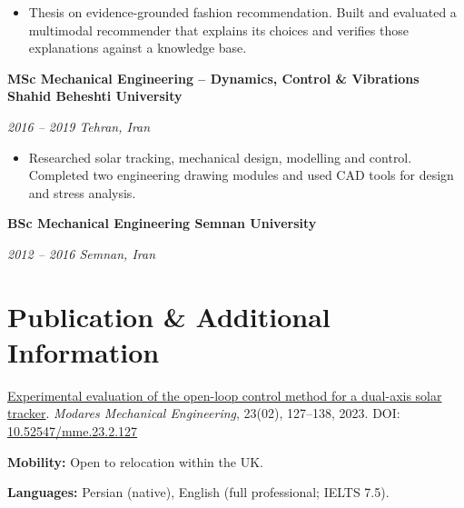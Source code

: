 \documentclass[10pt,a4paper]{article}
\let\cvOriginalTextbf\textbf
\renewcommand{\textbf}[1]{{\fontsize{10.5pt}{14pt}\selectfont\cvOriginalTextbf{#1}}}
\providecommand{\tightlist}{\setlength{\itemsep}{3pt}\setlength{\parskip}{0pt}}
\begin{document}
\begin{itemize}
\tightlist
\item
  Thesis on evidence-grounded fashion recommendation. Built and
  evaluated a multimodal recommender that explains its choices and
  verifies those explanations against a knowledge base.
\end{itemize}

\textbf{MSc Mechanical Engineering -- Dynamics, Control \& Vibrations
\textbar{} Shahid Beheshti University}

\emph{2016 -- 2019 \textbar{} Tehran, Iran}

\begin{itemize}
\tightlist
\item
  Researched solar tracking, mechanical design, modelling and control.
  Completed two engineering drawing modules and used CAD tools for
  design and stress analysis.
\end{itemize}

\textbf{BSc Mechanical Engineering \textbar{} Semnan University}

\emph{2012 -- 2016 \textbar{} Semnan, Iran}

\section{Publication \& Additional
Information}\label{publication-additional-information}

\href{https://mme.modares.ac.ir/article_11271.html}{Experimental
evaluation of the open-loop control method for a dual-axis solar
tracker}. \emph{Modares Mechanical Engineering}, 23(02), 127--138, 2023.
DOI: \href{https://doi.org/10.52547/mme.23.2.127}{10.52547/mme.23.2.127}

\textbf{Mobility:} Open to relocation within the UK.

\textbf{Languages:} Persian (native), English (full professional; IELTS
7.5).
\end{document}
